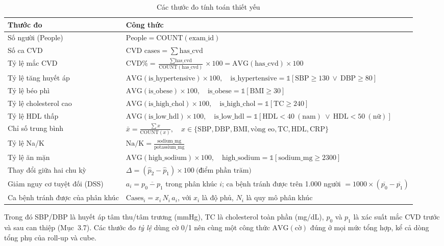 \begin{table}[H]
\renewcommand{\arraystretch}{1.35}\setlength{\extrarowheight}{3pt}
\centering
\caption{Các thước đo tính toán thiết yếu}
\small
\renewcommand{\arraystretch}{1.5}
\begin{tabularx}{\textwidth}{|p{3.5cm}|X|}
\hline
\textbf{Thước đo} & \textbf{Công thức} \\ \hline
Số người (People) & $\displaystyle \text{People} = \mathrm{COUNT}(\text{exam\_id})$ \\ \hline
Số ca CVD & $\displaystyle \text{CVD cases} = \sum \text{has\_cvd}$ \\ \hline
Tỷ lệ mắc CVD & $\displaystyle \text{CVD}\% = \frac{\sum \text{has\_cvd}}{\mathrm{COUNT}(\text{has\_cvd})}\times 100 = \mathrm{AVG}(\text{has\_cvd})\times 100$ \\ \hline
Tỷ lệ tăng huyết áp & $\displaystyle \mathrm{AVG}(\text{is\_hypertensive})\times 100,\quad \text{is\_hypertensive}=\mathbb{1}[\mathrm{SBP}\ge 130 \ \lor\ \mathrm{DBP}\ge 80]$ \\ \hline
Tỷ lệ béo phì & $\displaystyle \mathrm{AVG}(\text{is\_obese})\times 100,\quad \text{is\_obese}=\mathbb{1}[\mathrm{BMI}\ge 30]$ \\ \hline
Tỷ lệ cholesterol cao & $\displaystyle \mathrm{AVG}(\text{is\_high\_chol})\times 100,\quad \text{is\_high\_chol}=\mathbb{1}[\mathrm{TC}\ge 240]$ \\ \hline
Tỷ lệ HDL thấp & $\displaystyle \mathrm{AVG}(\text{is\_low\_hdl})\times 100,\quad \text{is\_low\_hdl}=\mathbb{1}[\mathrm{HDL}<40\ (\text{nam})\ \lor\ \mathrm{HDL}<50\ (\text{nữ})]$ \\ \hline
Chỉ số trung bình & $\displaystyle \bar{x}=\frac{\sum x}{\mathrm{COUNT}(x)},\quad x\in\{\mathrm{SBP},\mathrm{DBP},\mathrm{BMI},\text{vòng eo},\mathrm{TC},\mathrm{HDL},\mathrm{CRP}\}$ \\ \hline
Tỷ lệ Na/K & $\displaystyle \text{Na/K}=\frac{\text{sodium\_mg}}{\text{potassium\_mg}}$ \\ \hline
Tỷ lệ ăn mặn & $\displaystyle \mathrm{AVG}(\text{high\_sodium})\times 100,\quad \text{high\_sodium}=\mathbb{1}[\text{sodium\_mg}\ge 2300]$ \\ \hline
Thay đổi giữa hai chu kỳ & $\displaystyle \Delta = (\hat p_2-\hat p_1)\times 100\ \text{(điểm phần trăm)}$ \\ \hline
Giảm nguy cơ tuyệt đối (DSS) & $\displaystyle a_i=\overline{p_0-p_1}$ trong phân khúc $i$; \quad ca bệnh tránh được trên 1.000 người $=1000\times(\overline{p_0}-\overline{p_1})$ \\ \hline
Ca bệnh tránh được của phân khúc & $\displaystyle \text{Cases}_i = x_i\, N_i\, a_i$, với $x_i$ là độ phủ, $N_i$ là quy mô phân khúc \\ \hline
\end{tabularx}
\end{table}
Trong đó SBP/DBP là huyết áp tâm thu/tâm trương (mmHg), TC là cholesterol toàn phần (mg/dL), $p_0$ và $p_1$ là xác suất mắc CVD trước và sau can thiệp (Mục~3.7). Các thước đo \emph{tỷ lệ} dùng cờ 0/1 nên cùng một công thức $\mathrm{AVG}(\text{cờ})$ đúng ở mọi mức tổng hợp, kể cả dòng tổng phụ của roll-up và cube.

